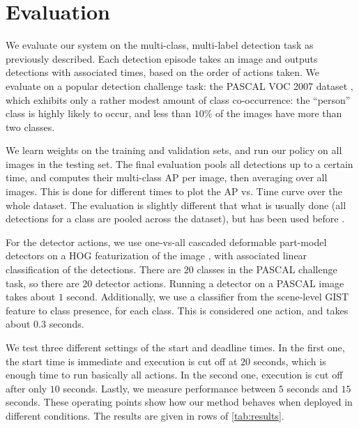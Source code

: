 \section{Evaluation} \label{sec:evaluation}

We evaluate our system on the multi-class, multi-label detection task as previously described.
Each detection episode takes an image and outputs detections with associated times, based on the order of actions taken.
We evaluate on a popular detection challenge task: the PASCAL VOC 2007 dataset \cite{pascal-voc-2010}, which exhibits only a rather modest amount of class co-occurrence: the ``person'' class is highly likely to occur, and less than $10\%$ of the images have more than two classes.

We learn weights on the training and validation sets, and run our policy on all images in the testing set.
The final evaluation pools all detections up to a certain time, and computes their multi-class AP per image, then averaging over all images.
This is done for different times to plot the AP vs. Time curve over the whole dataset.
The evaluation is slightly different that what is usually done (all detections for a class are pooled across the dataset), but has been used before \cite{Desai2009}.

For the detector actions, we use one-vs-all cascaded deformable part-model detectors on a HOG featurization of the image \cite{Felzenszwalb2010b}, with associated linear classification of the detections.
There are $20$ classes in the PASCAL challenge task, so there are $20$ detector actions.
Running a detector on a PASCAL image takes about $1$ second.
Additionally, we use a classifier from the scene-level GIST feature to class presence, for each class.
This is considered one action, and takes about $0.3$ seconds.

We test three different settings of the start and deadline times.
In the first one, the start time is immediate and execution is cut off at $20$ seconds, which is enough time to run basically all actions.
In the second one, execution is cut off after only $10$ seconds.
Lastly, we measure performance between $5$ seconds and $15$ seconds.
These operating points show how our method behaves when deployed in different conditions.
The results are given in rows of \autoref{tab:results}.

